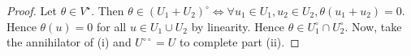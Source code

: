 \begin{proof}
	Let \( \theta \in V^\star \).
	Then \( \theta \in (U_1 + U_2)^\circ \iff \forall u_1 \in U_1, u_2 \in U_2, \theta(u_1 + u_2) = 0 \).
	Hence \( \theta(u) = 0 \) for all \( u \in U_1 \cup U_2 \) by linearity.
	Hence \( \theta \in U_1^\circ \cap U_2^\circ \).
	Now, take the annihilator of (i) and \( U^{\circ\circ} = U \) to complete part (ii).
\end{proof}
